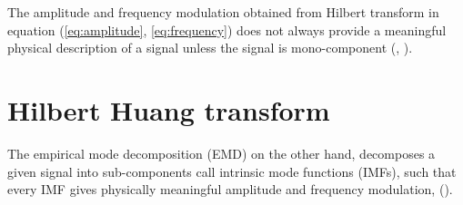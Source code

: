 \documentclass[../Main/thesis.tex]{subfiles}
\begin{document}
The amplitude and frequency modulation obtained from Hilbert transform in equation (\ref{eq:amplitude}, \ref{eq:frequency}) does not always provide a meaningful physical description of a signal unless the signal is mono-component (\cite{huang98}, \cite{huang08}).



 
 
 \section{Hilbert Huang transform}
 \label{sec:emd}
  The empirical mode decomposition (EMD) on the other hand, decomposes a given signal into sub-components call intrinsic mode functions (IMFs), such that every IMF gives physically meaningful amplitude and frequency modulation, (\cite{huang98}).
 
\end{document}
